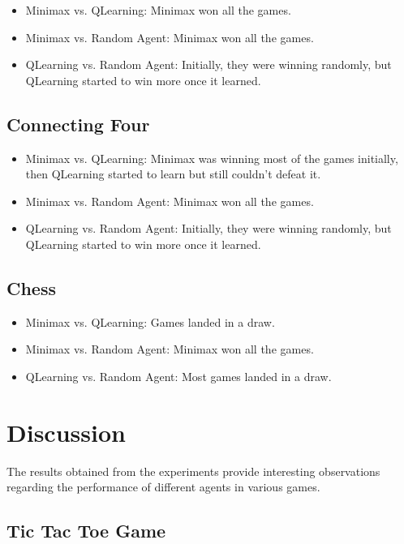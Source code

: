 \documentclass{article}
\begin{document}
\begin{itemize}
  \item Minimax vs. QLearning: Minimax won all the games.
  \item Minimax vs. Random Agent: Minimax won all the games.
  \item QLearning vs. Random Agent: Initially, they were winning randomly, but QLearning started to win more once it learned.
\end{itemize}

\subsection{Connecting Four}

\begin{itemize}
  \item Minimax vs. QLearning: Minimax was winning most of the games initially, then QLearning started to learn but still couldn't defeat it.
  \item Minimax vs. Random Agent: Minimax won all the games.
  \item QLearning vs. Random Agent: Initially, they were winning randomly, but QLearning started to win more once it learned.
\end{itemize}

\subsection{Chess}

\begin{itemize}
  \item Minimax vs. QLearning: Games landed in a draw.
  \item Minimax vs. Random Agent: Minimax won all the games.
  \item QLearning vs. Random Agent: Most games landed in a draw.
\end{itemize}


\section{Discussion}

The results obtained from the experiments provide interesting observations regarding the performance of different agents in various games.

\subsection{Tic Tac Toe Game}
\end{document}
